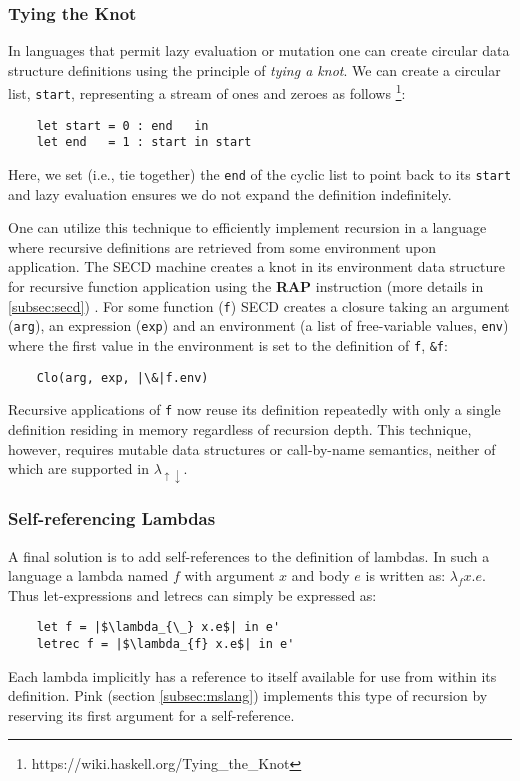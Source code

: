 \documentclass[a4paper,12pt,twoside,openright]{report}
\theoremstyle{definition}
\newcommand{\mslang}{$\lambda_{\uparrow\downarrow}$}
\begin{document}
\subsubsection{Tying the Knot}\label{ssubsec:background_knot}
In languages that permit lazy evaluation or mutation one can create circular data structure definitions using the principle of \textit{tying a knot}. We can create a circular list, \texttt{start}, representing a stream of ones and zeroes as follows \footnote{https://wiki.haskell.org/Tying\_the\_Knot}:
\begin{verbatim}
    let start = 0 : end   in
    let end   = 1 : start in start
\end{verbatim}
Here, we set (i.e., tie together) the \texttt{end} of the cyclic list to point back to its \texttt{start} and lazy evaluation ensures we do not expand the definition indefinitely.

One can utilize this technique to efficiently implement recursion in a language where recursive definitions are retrieved from some environment upon application. The SECD machine creates a knot in its environment data structure for recursive function application using the \textbf{RAP} instruction (more details in \ref{subsec:secd}) \cite{paulson1995foundations}. For some function (\texttt{f}) SECD creates a closure taking an argument (\texttt{arg}), an expression (\texttt{exp}) and an environment (a list of free-variable values, \texttt{env}) where the first value in the environment is set to the definition of \texttt{f}, \texttt{\&f}:
\begin{verbatim}
    Clo(arg, exp, |\&|f.env)
\end{verbatim}
Recursive applications of \texttt{f} now reuse its definition repeatedly with only a single definition residing in memory regardless of recursion depth. This technique, however, requires mutable data structures or call-by-name semantics, neither of which are supported in \mslang.

\subsubsection{Self-referencing Lambdas}
A final solution is to add self-references to the definition of lambdas. In such a language a lambda named $f$ with argument $x$ and body $e$ is written as: $\lambda_f x.e$. Thus let-expressions and letrecs can simply be expressed as:
\begin{verbatim}
    let f = |$\lambda_{\_} x.e$| in e'
    letrec f = |$\lambda_{f} x.e$| in e'
\end{verbatim}
Each lambda implicitly has a reference to itself available for use from within its definition. Pink (section \ref{subsec:mslang}) implements this type of recursion by reserving its first argument for a self-reference.
\end{document}
